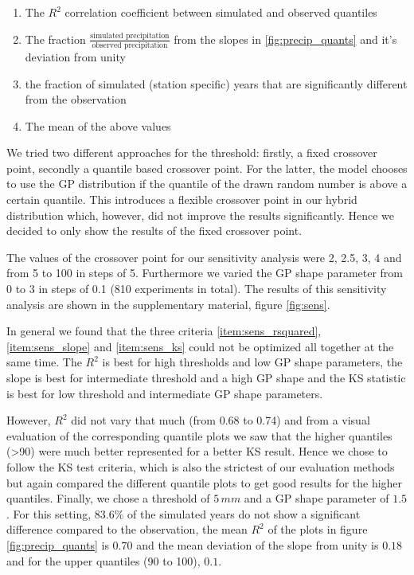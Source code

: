 \begin{refsection}
\begin{enumerate}
	\item The $R^2$  correlation coefficient between simulated and observed quantiles \label{item:sens_rsquared}
	\item The fraction $\frac{\text{simulated precipitation}}{{\text{observed precipitation}}}$ from the slopes in \ref{fig:precip_quants} and it's deviation from unity \label{item:sens_slope}
	\item the fraction of simulated (station specific) years that are significantly different from the observation \label{item:sens_ks}
	\item The mean of the above values \label{item:sens_mean}
\end{enumerate}

We tried two different approaches for the threshold: firstly, a fixed crossover point, secondly a quantile based crossover point. For the latter, the model chooses to use the GP distribution if the quantile of the drawn random number is above a certain  quantile. This introduces a flexible crossover point in our hybrid distribution which, however, did not improve the results significantly. Hence we decided to only show the results of the fixed crossover point.

The values of the crossover point for  our sensitivity analysis were 2, 2.5, 3, 4 and from 5 to 100 in steps of 5. Furthermore we varied the GP shape parameter from 0 to 3 in steps of 0.1 (810 experiments in total). The results of this sensitivity analysis are shown in the supplementary material, figure \ref{fig:sens}.

In general we found that the three criteria \ref{item:sens_rsquared}, \ref{item:sens_slope} and \ref{item:sens_ks} could not be optimized all together at the same time. The $R^2$ is best for high thresholds and low GP shape parameters, the slope is best for intermediate threshold and a high GP shape and the KS statistic is best for low threshold and intermediate GP shape parameters.

However, $R^2$ did not vary that much (from 0.68 to 0.74) and from a visual evaluation of the corresponding quantile plots we saw that the higher quantiles (>90) were much better represented for a better KS result. Hence we chose to follow the KS test criteria, which is also the strictest of our evaluation methods but again compared the different quantile plots to get good results for the higher quantiles.  Finally, we chose a threshold of $5\,\unit{mm}$ and a GP shape parameter of $1.5$. For this setting, $83.6\%$ of the simulated years do not show a significant difference compared to the observation, the mean $R^2$ of the plots in figure \ref{fig:precip_quants} is $0.70$ and the mean deviation of the slope from unity is $0.18$ and for the upper quantiles (90 to 100), $0.1$.


\end{refsection}
